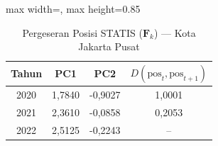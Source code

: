 \begin{table}[H]
\centering
\caption{Pergeseran Posisi STATIS ($\mathbf{F}_k$) --- Kota Jakarta Pusat} \label{tab:sample1jarak_statis_skor_kota_jakarta_pusat}
\begin{adjustbox}{max width=\textwidth, max height=0.85\textheight}
\begin{tabular}{|c|c|c|c|}
\hline
\textbf{Tahun} & \textbf{PC1} & \textbf{PC2} & \textbf{$D(\text{pos}_t, \text{pos}_{t+1})$} \\
\hline
2020 & 1,7840 & -0,9027 & 1,0001 \\
2021 & 2,3610 & -0,0858 & 0,2053 \\
2022 & 2,5125 & -0,2243 & -- \\
\hline
\end{tabular}
\end{adjustbox}
\end{table}